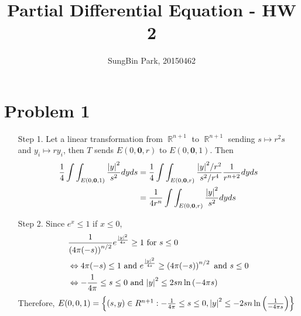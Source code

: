 \documentclass{article}
\DeclareMathOperator{\rr}{\mathbb{R}}
\begin{document}
\title{Partial Differential Equation - HW 2}
\author{SungBin Park, 20150462} 

 \maketitle

\section*{Problem 1}
\begin{enumerate}
	\item [Step 1.] Let a linear transformation from $\rr^{n+1}$ to $\rr^{n+1}$ sending $s\mapsto r^2 s$ and $y_i\mapsto ry_i$, then $T$ sends $E(0, \bm{0}, r)$ to $E(0, \bm{0}, 1)$. Then
	\begin{equation*}
	\begin{split}
	\frac{1}{4}\int\int_{E(0, \bm{0}, 1)}\frac{\abs{y}^2}{s^2}dyds&=\frac{1}{4}\int\int_{E(0, \bm{0}, r)}\frac{\abs{y}^2/r^2}{s^2/r^4}\frac{1}{r^{n+2}}dyds \\
	&=\frac{1}{4r^n}\int\int_{E(0, \bm{0}, r)}\frac{\abs{y}^2}{s^2}dyds
	\end{split}
	\end{equation*}
    \item [Step 2.] Since $e^x\leq 1$ if $x\leq 0$,
    \begin{equation*}
        \begin{split}
            &\frac{1}{\left(4\pi(-s)\right)^{n/2}}e^{\frac{\abs{y}^2}{4s}}\geq 1 \text{ for }s\leq 0\\
            &\Leftrightarrow 4\pi(-s)\leq 1 \text{ and }e^{\frac{\abs{y}^2}{4s}}\geq \left(4\pi(-s)\right)^{n/2} \text{ and } s\leq 0\\
            &\Leftrightarrow -\frac{1}{4\pi}\leq s\leq 0 \text{ and } \abs{y}^2\leq 2sn\ln{(-4\pi s)}
        \end{split}
    \end{equation*}
    Therefore, $E(0,0,1)=\left\{(s,y)\in R^{n+1}:-\frac{1}{4\pi}\leq s\leq 0 , \abs{y}^2\leq -2sn\ln{\left(\frac{1}{-4\pi s}\right)}\right\}$
    

\end{enumerate}
\end{document}
